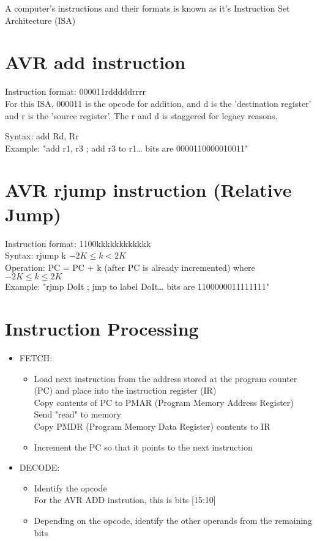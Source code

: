 \documentclass{article}
\begin{document}
A computer's instructions and their formats is known as it's Instruction Set Architecture (ISA)

\section{AVR add instruction}
Instruction format: 000011rdddddrrrr\\
For this ISA, 000011 is the opcode for addition, and d is the 'destination register' and r is the 'source register'. The r and d is staggered for legacy reasons.

Syntax: add Rd, Rr\\
Example: "add r1, r3 ; add r3 to r1… bits are 0000110000010011"\\

\section{AVR rjump instruction (Relative Jump)}
Instruction format: 1100kkkkkkkkkkkk\\

Syntax: rjump k $-2K \leq k < 2K$\\
Operation: PC = PC + k (after PC is already incremented) where $-2K \leq k \leq 2K$\\
Example: "rjmp DoIt ; jmp to label DoIt… bits are 1100000011111111"\\

\section{Instruction Processing}

\begin{itemize}
  \item {FETCH:
    \begin{itemize}
      \item Load next instruction from the address stored at the program counter (PC) and place into the instruction register (IR)\\
      Copy contents of PC to PMAR (Program Memory Address Register)\\
      Send "read" to memory\\
      Copy PMDR (Program Memory Data Register) contents to IR
      \item Increment the PC so that it points to the next instruction
    \end{itemize}
  }
  \item {DECODE:
    \begin{itemize}
      \item Identify the opcode\\
        For the AVR ADD instrution, this is bits [15:10]
      \item Depending on the opcode, identify the other operands from the remaining bits
    \end{itemize}
  }
\end{itemize}
\end{document}
